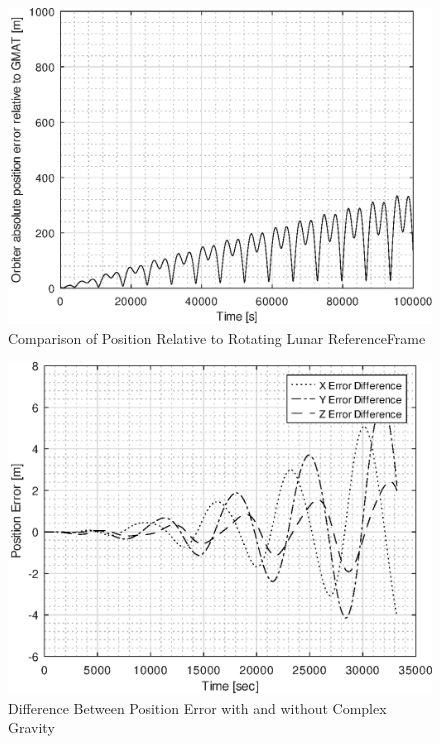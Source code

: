 \documentclass[Orbiter Technical Reference.tex]{subfiles}
\begin{document}
\begin{figure}[H]
\centering
\includegraphics[width=1.0\textwidth]{position_error}
\caption{Comparison of Position Relative to Rotating Lunar ReferenceFrame}
\label{fig:error}
\end{figure}

\begin{figure}[H]
\centering
\includegraphics[width=1.0\textwidth]{errordiff.eps}
\caption{Difference Between Position Error with and without Complex Gravity}
\label{fig:errordiff}
\end{figure}
\end{document}
